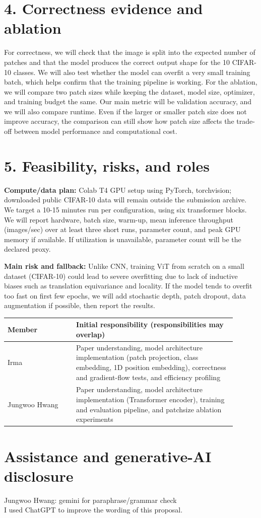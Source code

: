\documentclass[10pt]{article}
\begin{document}
\section*{4. Correctness evidence and ablation}

For correctness, we will check that the image is split into the expected number of patches and that the model produces the correct output shape for the 10 CIFAR-10 classes. We will also test whether the model can overfit a very small training batch, which helps confirm that the training pipeline is working. For the ablation, we will compare two patch sizes while keeping the dataset, model size, optimizer, and training budget the same. Our main metric will be validation accuracy, and we will also compare runtime. Even if the larger or smaller patch size does not improve accuracy, the comparison can still show how patch size affects the trade-off between model performance and computational cost.

\section*{5. Feasibility, risks, and roles}

\textbf{Compute/data plan:} 
Colab T4 GPU setup using PyTorch, torchvision; downloaded public CIFAR-10 data will remain outside the submission archive. We target a 10-15 minutes run per configuration, using six transformer blocks. We will report hardware, batch size, warm-up, mean inference throughput (images/sec) over at least three short runs, parameter count, and peak GPU memory if available. If utilization is unavailable, parameter count will be the declared proxy.

\textbf{Main risk and fallback:} 
Unlike CNN, training ViT from scratch on a small dataset (CIFAR-10) could lead to severe overfitting due to lack of inductive biases such as translation equivariance and locality. If the model tends to overfit too fast on first few epochs, we will add stochastic depth, patch dropout, data augmentation if possible, then report the results.

\vspace{-2pt}
\begin{center}\small
\begin{tabular}{p{0.27\linewidth}p{0.63\linewidth}}
\toprule
Member & Initial responsibility (responsibilities may overlap) \\
\midrule
Irma & Paper understanding, model architecture implementation (patch projection, class embedding, 1D position embedding), correctness and gradient-flow tests, and efficiency profiling \\
Jungwoo Hwang & Paper understanding, model architecture implementation (Transformer encoder), training and evaluation pipeline, and patchsize ablation experiments \\
\bottomrule
\end{tabular}
\end{center}

\section*{Assistance and generative-AI disclosure}

Jungwoo Hwang: gemini for paraphrase/grammar check\\
I used ChatGPT to improve the wording of this proposal.
\end{document}
